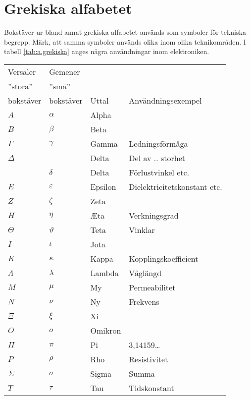 \section{Grekiska alfabetet}

  Bokstäver ur bland annat grekiska alfabetet används som symboler för
  tekniska begrepp.
  Märk, att samma symboler används olika inom olika teknikområden.
  I tabell \ref{tab:a.grekiska} anges några användningar inom elektroniken.

\begin{table*}
  \begin{center}
  \begin{tabular}{ll|l|l}
    Versaler  & Gemener   &       & \\
    ''stora'' & ''små''   &       & \\
    bokstäver & bokstäver & Uttal & Användningsexempel \\
    \hline
    \(A\) & \(\alpha\) & Alpha & \\
    \(B\) & \(\beta\) & Beta & \\
    \(\Gamma\) & \(\gamma\) & Gamma & Ledningsförmåga \\
    \(\Delta\) & & Delta & Del av .. storhet \\
    & \(\delta\) & Delta & Förlustvinkel etc. \\
    \(E\) & \(\varepsilon\) & Epsilon & Dielektricitetskonstant etc.\\
    \(Z\) & \(\zeta\) & Zeta & \\
    \(H\) & \(\eta\) & \AE ta & Verkningsgrad\\
    \(\Theta\) & \(\vartheta\) & Teta & Vinklar \\
    \(I\) & \(\iota\) & Jota & \\
    \(K\) & \(\kappa\) & Kappa & Kopplingskoefficient \\
    \(\Lambda\) & \(\lambda\) & Lambda & Våglängd \\
    \(M\) & \(\mu\) & My & Permeabilitet \\
    \(N\) & \(\nu\) & Ny & Frekvens \\
    \(\Xi\) & \(\xi\) & Xi & \\
    \(O\) & \(o\) & Omikron & \\
    \(\Pi\) & \(\pi\) & Pi & 3,14159\dots \\
    \(P\) & \(\rho\) & Rho & Resistivitet \\
    \(\Sigma\) & \(\sigma\) & Sigma & Summa \\
    \(T\) & \(\tau\) & Tau & Tidskonstant \\

\end{tabular}
\end{center}
\end{table*}
